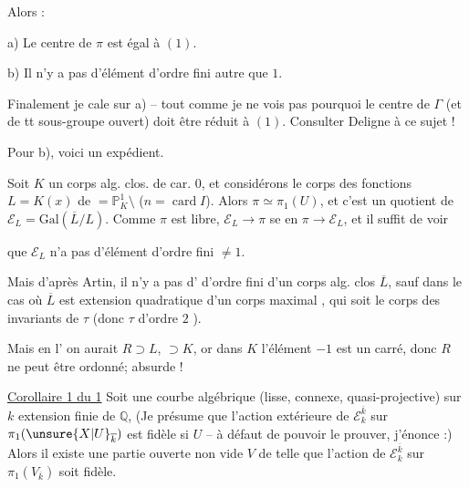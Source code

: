 Alors :

a) Le centre de $\pi$ est  égal à $(1)$.

b) Il n'y a pas  d'élément d'ordre fini autre que $1$.

Finalement je cale sur a) -- tout comme je ne vois pas pourquoi le centre de $\Gamma$
(et de tt sous-groupe ouvert) doit être réduit à $(1)$. Consulter Deligne à ce sujet !

Pour b), voici un expédient.

Soit $K$ un corps alg. clos. de car. $0$, et considérons le corps des fonctions
$L=K(x)$ de 
$=\mathbb P^1_K\setminus$
($n=\operatorname{card} I$). Alors $\pi\simeq\pi_1(U)$, et c'est un quotient de
$\mathcal E_L=\mathrm{Gal}(\overline L/L)$.
Comme $\pi$ est libre, $\mathcal E_L\longrightarrow\pi$ se  en
$\pi\longrightarrow\mathcal E_L$, et il suffit de voir



que $\mathcal E_L$ n'a pas d'élément d'ordre fini $\ne 1$.

Mais d'après Artin, il n'y a pas d' \inserted{\unsure{$\tau$}}
d'ordre fini  d'un corps alg. clos $\overline L$,
sauf dans le cas où $\overline L$ est extension quadratique d'un
 corps  maximal
,  qui soit le corps des invariants de
$\tau$ (donc $\tau$ d'ordre $2$ ).

 Mais en l' on aurait $R\supset L$,
$\supset K$, or dans $K$ l'élément $-1$ est un carré,
donc $R$ ne peut être ordonné; absurde !

\uline{Corollaire 1 du  1} Soit  une courbe algébrique
(lisse,  connexe, quasi-projective) sur $k$ extension finie de
$\mathbb Q$,  (Je présume que l'action extérieure de
$\mathcal E_k^{\overline k}$ sur $\pi_1(\unsure{X|U}_{\overline k})$ est fidèle
si $U$  -- à défaut de pouvoir le prouver, j'énonce :)
Alors il existe une partie ouverte non vide $V$ de  telle que
l'action  de $\mathcal E_k^{\overline k}$ sur
$\pi_1(V_{\overline k})$ soit fidèle.

